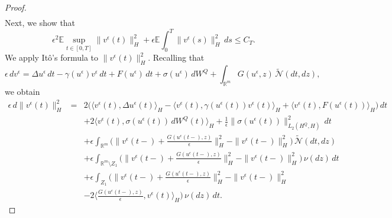 \documentclass[11pt]{article}
\theoremstyle{plain}
\numberwithin{equation}{section}
\begin{document}
\begin{proof}
\begin{eqnarray}
\end{eqnarray}
 Next, we show that
\[
\epsilon^2 \mathbb{E}\sup_{t\in[0,T]}\|v^{\epsilon}(t)\|_{H}^2 + \epsilon \mathbb{E}\int_0^T \|v^{\epsilon}(s)\|_{H}^2\,ds \le C_T .
\]
We apply It\^o's formula to $\|v^{\epsilon}(t)\|_{H}^2$.
Recalling that
\[
\epsilon\, dv^{\epsilon}= \Delta u^{\epsilon}\,dt- \gamma(u^{\epsilon}) v^{\epsilon}\,dt+ F(u^{\epsilon})\,dt+ \sigma(u^{\epsilon})\,dW^Q
+ \int_{\mathbb R^m} G(u^{\epsilon},z)\,\tilde{\mathcal N}(dt,dz),
\]
we obtain
\begin{eqnarray}\label{e:v-v}
\epsilon\, d\|v^{\epsilon}(t)\|_{H}^2
&=& 2\Big(
\langle v^{\epsilon}(t),\Delta u^{\epsilon}(t)\rangle_H
- \langle v^{\epsilon}(t),\gamma(u^{\epsilon}(t))v^{\epsilon}(t)\rangle_H
+ \langle v^{\epsilon}(t),F(u^{\epsilon}(t))\rangle_H
\Big)\,dt \nonumber\\
&& + 2\langle v^{\epsilon}(t),\sigma(u^{\epsilon}(t))\,dW^Q(t)\rangle_H
+ \frac{1}{\epsilon}\|\sigma(u^{\epsilon}(t))\|_{L_2(H^Q,H)}^2\,dt \nonumber\\
&& + \epsilon\int_{\mathbb R^m}
\Big(
\|v^{\epsilon}(t-)+\tfrac{G(u^{\epsilon}(t-),z)}{\epsilon}\|_{H}^2
- \|v^{\epsilon}(t-)\|_{H}^2
\Big)\,\tilde{\mathcal N}(dt,dz) \nonumber\\
&& + \epsilon\int_{\mathbb R^m\setminus Z_1}
\Big(
\|v^{\epsilon}(t-)+\tfrac{G(u^{\epsilon}(t-),z)}{\epsilon}\|_{H}^2
- \|v^{\epsilon}(t-)\|_{H}^2
\Big)\,\nu(dz)\,dt \nonumber\\
&& + \epsilon\int_{Z_1}
\Big(
\|v^{\epsilon}(t-)+\tfrac{G(u^{\epsilon}(t-),z)}{\epsilon}\|_{H}^2
- \|v^{\epsilon}(t-)\|_{H}^2
\nonumber\\
&&- 2\big\langle \tfrac{G(u^{\epsilon}(t-),z)}{\epsilon},v^{\epsilon}(t)\big\rangle_H
\Big)\,\nu(dz)\,dt .
\end{eqnarray}


\end{proof}
\end{document}
